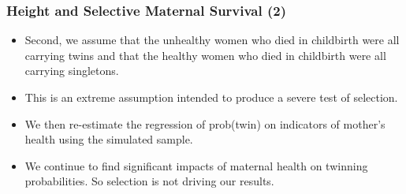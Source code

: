 \documentclass[10pt,letterpaper,subeqn]{beamer}
\begin{document}
\begin{frame}
\frametitle{Height and Selective Maternal Survival (2)}
\begin{itemize}
\item Second, we assume that the unhealthy women who died in childbirth were all carrying twins and that the healthy women who died in childbirth were all carrying singletons. 
\item This is an extreme assumption intended to produce a severe test of selection.
\item We then re-estimate the regression of prob(twin) on indicators of mother's health using the simulated sample.
\item We continue to find significant impacts of maternal health on twinning probabilities. So selection is not driving our results.
\end{itemize}
\end{frame}
	

\begin{frame}[label=surv]

\hyperlink{robust}{}
\end{frame}


\end{document}
